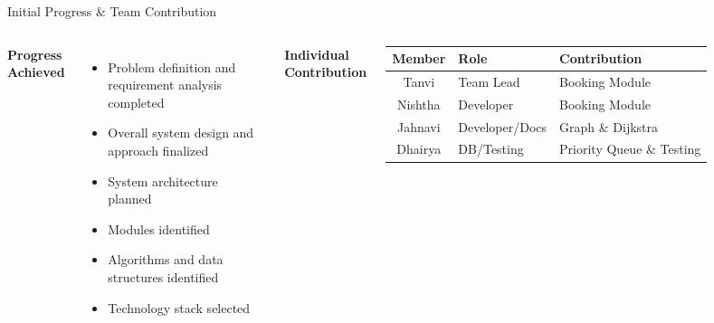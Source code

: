 \documentclass[aspectratio=169,11pt]{beamer}
\begin{document}
\begin{frame}{Initial Progress \& Team Contribution}

\begin{columns}[T,totalwidth=\textwidth]


\textbf{\color{GEUBlue}Progress Achieved}
\begin{itemize}\itemsep2pt
\item Problem definition and requirement analysis completed
\item Overall system design and approach finalized
\item System architecture planned
\item Modules identified
\item Algorithms and data structures identified
\item Technology stack selected
\end{itemize}


\textbf{\color{GEUBlue}Individual Contribution}

\vspace{2mm}

\small
\begin{tabular}{|c|p{2.5cm}|p{2.9cm}|}
\hline
\textbf{Member} & \textbf{Role} & \textbf{Contribution} \\
\hline
Tanvi & Team Lead & Booking Module \\
\hline
Nishtha & Developer & Booking Module \\
\hline
Jahnavi & Developer/Docs & Graph \& Dijkstra \\
\hline
Dhairya & DB/Testing & Priority Queue \& Testing \\
\hline
\end{tabular}

\end{columns}

\end{frame}
\end{document}
